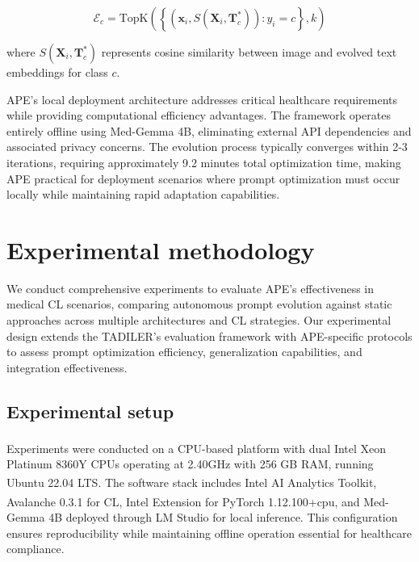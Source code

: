\documentclass[pdflatex,sn-mathphys-num]{sn-jnl}%
\theoremstyle{thmstyleone}%
\theoremstyle{thmstyletwo}%
\theoremstyle{thmstylethree}%
\begin{document}
\begin{equation}
\mathcal{E}_c = \text{TopK}\left(\left\{(\mathbf{x}_i, S(\mathbf{X}_i, \mathbf{T}^*_c)) : y_i = c\right\}, k\right)
\end{equation}

where $S(\mathbf{X}_i, \mathbf{T}^*_c)$ represents cosine similarity between image and evolved text embeddings for class $c$.

APE's local deployment architecture addresses critical healthcare requirements while providing computational efficiency advantages. The framework operates entirely offline using Med-Gemma 4B, eliminating external API dependencies and associated privacy concerns. The evolution process typically converges within 2-3 iterations, requiring approximately 9.2 minutes total optimization time, making APE practical for deployment scenarios where prompt optimization must occur locally while maintaining rapid adaptation capabilities.






\section{Experimental methodology}
\label{sec:experimental_methodology}

We conduct comprehensive experiments to evaluate APE's effectiveness in medical CL scenarios, comparing autonomous prompt evolution against static approaches across multiple architectures and CL strategies. Our experimental design extends the TADILER's evaluation framework \cite{BravoRocca2025} with APE-specific protocols to assess prompt optimization efficiency, generalization capabilities, and integration effectiveness.

\subsection{Experimental setup}
Experiments were conducted on a CPU-based platform with dual Intel\textsuperscript{\textregistered} Xeon\textsuperscript{\textregistered} Platinum 8360Y CPUs operating at 2.40GHz with 256 GB RAM, running Ubuntu 22.04 LTS. The software stack includes Intel\textsuperscript{\textregistered} AI Analytics Toolkit, Avalanche 0.3.1 for CL, Intel\textsuperscript{\textregistered} Extension for PyTorch 1.12.100+cpu, and Med-Gemma 4B deployed through LM Studio for local inference. This configuration ensures reproducibility while maintaining offline operation essential for healthcare compliance.
\end{document}
